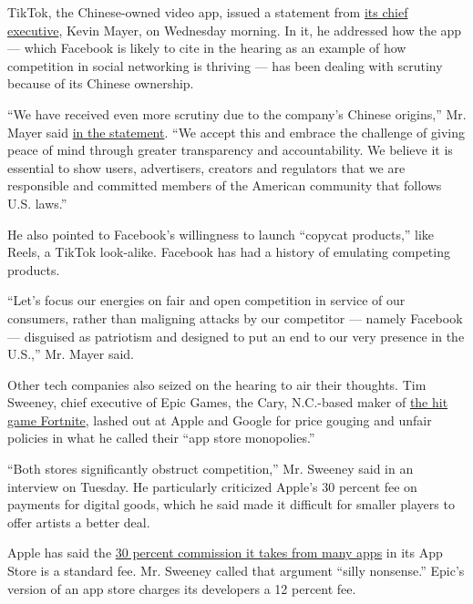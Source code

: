 TikTok, the Chinese-owned video app, issued a statement from
\href{https://www.nytimes3xbfgragh.onion/2020/05/18/business/media/tiktok-ceo-kevin-mayer.html}{its
chief executive}, Kevin Mayer, on Wednesday morning. In it, he addressed
how the app --- which Facebook is likely to cite in the hearing as an
example of how competition in social networking is thriving --- has been
dealing with scrutiny because of its Chinese ownership.

``We have received even more scrutiny due to the company's Chinese
origins,'' Mr. Mayer said
\href{https://newsroom.tiktok.com/en-us/fair-competition-and-transparency-benefits-us-all}{in
the statement}. ``We accept this and embrace the challenge of giving
peace of mind through greater transparency and accountability. We
believe it is essential to show users, advertisers, creators and
regulators that we are responsible and committed members of the American
community that follows U.S. laws.''

He also pointed to Facebook's willingness to launch ``copycat
products,'' like Reels, a TikTok look-alike. Facebook has had a history
of emulating competing products.

``Let's focus our energies on fair and open competition in service of
our consumers, rather than maligning attacks by our competitor ---
namely Facebook --- disguised as patriotism and designed to put an end
to our very presence in the U.S.,'' Mr. Mayer said.

Other tech companies also seized on the hearing to air their thoughts.
Tim Sweeney, chief executive of Epic Games, the Cary, N.C.-based maker
of
\href{https://www.nytimes3xbfgragh.onion/2018/07/25/arts/what-is-fortnite-battle-royale-nyt.html}{the
hit game Fortnite}, lashed out at Apple and Google for price gouging and
unfair policies in what he called their ``app store monopolies.''

``Both stores significantly obstruct competition,'' Mr. Sweeney said in
an interview on Tuesday. He particularly criticized Apple's 30 percent
fee on payments for digital goods, which he said made it difficult for
smaller players to offer artists a better deal.

Apple has said the
\href{https://www.nytimes3xbfgragh.onion/2020/07/28/technology/apple-app-store-airbnb-classpass.html}{30
percent commission it takes from many apps} in its App Store is a
standard fee. Mr. Sweeney called that argument ``silly nonsense.''
Epic's version of an app store charges its developers a 12 percent fee.

